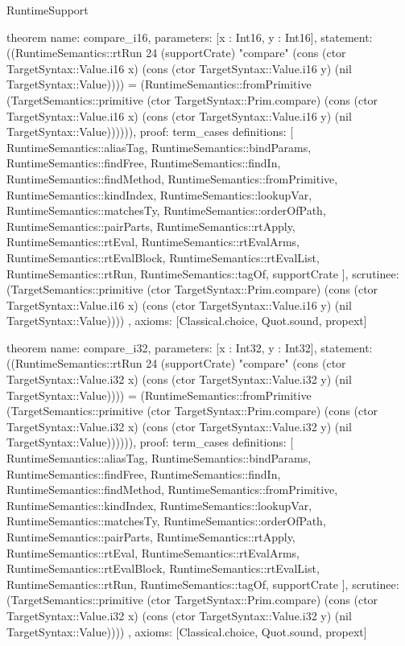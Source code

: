 \begin{lexlean}{RuntimeSupport}
\begin{semanticmodule}
theorem{
  name: compare_i16,
  parameters: [x : Int16, y : Int16],
  statement: ((RuntimeSemantics::rtRun 24 (supportCrate) "compare" (cons (ctor TargetSyntax::Value.i16 x) (cons (ctor TargetSyntax::Value.i16 y) (nil TargetSyntax::Value)))) = (RuntimeSemantics::fromPrimitive (TargetSemantics::primitive (ctor TargetSyntax::Prim.compare) (cons (ctor TargetSyntax::Value.i16 x) (cons (ctor TargetSyntax::Value.i16 y) (nil TargetSyntax::Value)))))),
  proof: term_cases{
    definitions: [
      RuntimeSemantics::aliasTag,
      RuntimeSemantics::bindParams,
      RuntimeSemantics::findFree,
      RuntimeSemantics::findIn,
      RuntimeSemantics::findMethod,
      RuntimeSemantics::fromPrimitive,
      RuntimeSemantics::kindIndex,
      RuntimeSemantics::lookupVar,
      RuntimeSemantics::matchesTy,
      RuntimeSemantics::orderOfPath,
      RuntimeSemantics::pairParts,
      RuntimeSemantics::rtApply,
      RuntimeSemantics::rtEval,
      RuntimeSemantics::rtEvalArms,
      RuntimeSemantics::rtEvalBlock,
      RuntimeSemantics::rtEvalList,
      RuntimeSemantics::rtRun,
      RuntimeSemantics::tagOf,
      supportCrate
    ],
    scrutinee: (TargetSemantics::primitive (ctor TargetSyntax::Prim.compare) (cons (ctor TargetSyntax::Value.i16 x) (cons (ctor TargetSyntax::Value.i16 y) (nil TargetSyntax::Value))))
  },
  axioms: [Classical.choice, Quot.sound, propext]
}

theorem{
  name: compare_i32,
  parameters: [x : Int32, y : Int32],
  statement: ((RuntimeSemantics::rtRun 24 (supportCrate) "compare" (cons (ctor TargetSyntax::Value.i32 x) (cons (ctor TargetSyntax::Value.i32 y) (nil TargetSyntax::Value)))) = (RuntimeSemantics::fromPrimitive (TargetSemantics::primitive (ctor TargetSyntax::Prim.compare) (cons (ctor TargetSyntax::Value.i32 x) (cons (ctor TargetSyntax::Value.i32 y) (nil TargetSyntax::Value)))))),
  proof: term_cases{
    definitions: [
      RuntimeSemantics::aliasTag,
      RuntimeSemantics::bindParams,
      RuntimeSemantics::findFree,
      RuntimeSemantics::findIn,
      RuntimeSemantics::findMethod,
      RuntimeSemantics::fromPrimitive,
      RuntimeSemantics::kindIndex,
      RuntimeSemantics::lookupVar,
      RuntimeSemantics::matchesTy,
      RuntimeSemantics::orderOfPath,
      RuntimeSemantics::pairParts,
      RuntimeSemantics::rtApply,
      RuntimeSemantics::rtEval,
      RuntimeSemantics::rtEvalArms,
      RuntimeSemantics::rtEvalBlock,
      RuntimeSemantics::rtEvalList,
      RuntimeSemantics::rtRun,
      RuntimeSemantics::tagOf,
      supportCrate
    ],
    scrutinee: (TargetSemantics::primitive (ctor TargetSyntax::Prim.compare) (cons (ctor TargetSyntax::Value.i32 x) (cons (ctor TargetSyntax::Value.i32 y) (nil TargetSyntax::Value))))
  },
  axioms: [Classical.choice, Quot.sound, propext]
}


\end{semanticmodule}
\end{lexlean}
